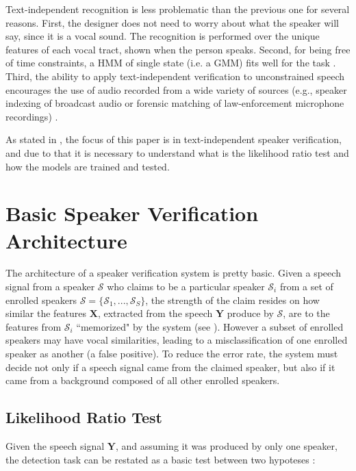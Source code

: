 Text-independent recognition is less problematic than the previous one for several reasons. First, the designer does not need to worry about what the speaker will say, since it is a vocal sound. The recognition is performed over the unique features of each vocal tract, shown when the person speaks. Second, for being free of time constraints, a HMM of single state (i.e. a GMM) fits well for the task \cite{hebert.2008}. Third, the ability to apply text-independent verification to unconstrained speech encourages the use of audio recorded from a wide variety of sources (e.g., speaker indexing of broadcast audio or forensic matching of law-enforcement microphone recordings) \cite{reynolds.campbell.2008}.

As stated in , the focus of this paper is in text-independent speaker verification, and due to that it is necessary to understand what is the likelihood ratio test and how the models are trained and tested.

\section{Basic Speaker Verification Architecture}

The architecture of a speaker verification system is pretty basic. Given a speech signal from a speaker $\mathcal{S}$ who claims to be a particular speaker $\mathcal{S}_i$ from a set of enrolled speakers $\boldsymbol{\mathcal{S}} = \{\mathcal{S}_1, ..., \mathcal{S}_S\}$, the strength of the claim resides on how similar the features $\boldsymbol{X}$, extracted from the speech $\boldsymbol{Y}$ produce by $\mathcal{S}$, are to the features from $\mathcal{S}_i$ ``memorized" by the system (see ). However a subset of enrolled speakers may have vocal similarities, leading to a misclassification of one enrolled speaker as another (a false positive). To reduce the error rate, the system must decide not only if a speech signal came from the claimed speaker, but also if it came from a background composed of all other enrolled speakers.

\subsection{Likelihood Ratio Test}

Given the speech signal $\boldsymbol{Y}$, and assuming it was produced by only one speaker, the detection task can be restated as a basic test between two hypoteses \cite{reynolds.1995b}:

